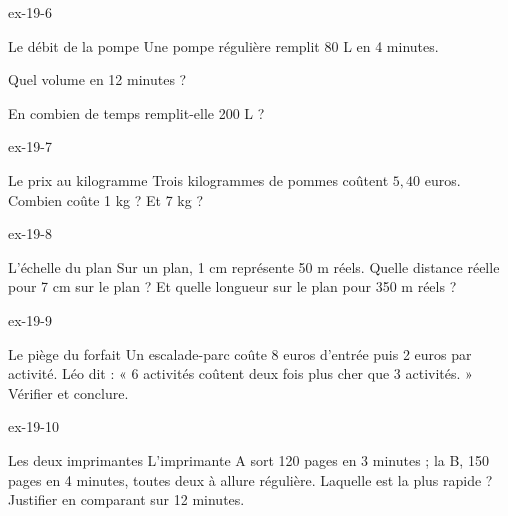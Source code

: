 \begin{blocLivre}{ex-19-6}\begin{exercice}[2]{Le débit de la pompe}
Une pompe régulière remplit 80 L en 4 minutes.\begin{questions}
\item Quel volume en 12 minutes ?
\item En combien de temps remplit-elle 200 L ?
\end{questions}
\end{exercice}\end{blocLivre}
\begin{blocLivre}{ex-19-7}\begin{exercice}[2]{Le prix au kilogramme}
Trois kilogrammes de pommes coûtent $5{,}40$ euros. Combien coûte 1 kg ? Et 7 kg ?
\end{exercice}\end{blocLivre}
\begin{blocLivre}{ex-19-8}\begin{exercice}[2]{L’échelle du plan}
Sur un plan, 1 cm représente 50 m réels. Quelle distance réelle pour 7 cm sur le plan ? Et quelle longueur sur le plan pour 350 m réels ?
\end{exercice}\end{blocLivre}
\begin{blocLivre}{ex-19-9}\begin{exercice}[2]{Le piège du forfait}
Un escalade-parc coûte 8 euros d’entrée puis 2 euros par activité. Léo dit : « 6 activités coûtent deux fois plus cher que 3 activités. » Vérifier et conclure.
\end{exercice}\end{blocLivre}
\begin{blocLivre}{ex-19-10}\begin{exercice}[2]{Les deux imprimantes}
L’imprimante A sort 120 pages en 3 minutes ; la B, 150 pages en 4 minutes, toutes deux à allure régulière. Laquelle est la plus rapide ? Justifier en comparant sur 12 minutes.
\end{exercice}\end{blocLivre}

